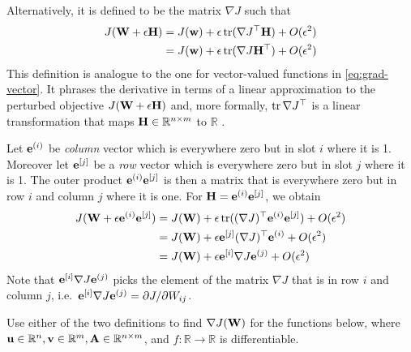 Alternatively, it is defined to be the matrix $\nabla J$ such that
\begin{align}
  J(\mathbf{W}+\epsilon \mathbf{H}) &= J(\mathbf{w}) + \epsilon \operatorname{tr}(\nabla J^\top \mathbf{H}) + O(\epsilon^2) \label{eq:grad-matrix}\\
                    &= J(\mathbf{w}) + \epsilon \operatorname{tr}(\nabla J \mathbf{H}^\top) + O(\epsilon^2)
\end{align}
This definition is analogue to the one for vector-valued functions
in \eqref{eq:grad-vector}. It phrases the derivative in terms of a linear
approximation to the perturbed objective $J(\mathbf{W}+\epsilon \mathbf{H})$ and, more formally,
$\operatorname{tr} \nabla J^\top$ is a linear transformation that maps
$\mathbf{H} \in \mathbb{R}^{n \times m}$ to $\mathbb{R}$ \citep[see e.g.][Chapter 9, for a formal treatment of derivatives]{Rudin1976}.

Let $\mathbf{e}^{(i)}$ be \emph{column} vector which is everywhere zero but in slot $i$
where it is 1. Moreover let $\mathbf{e}^{[j]}$ be a \emph{row} vector which is
everywhere zero but in slot $j$ where it is 1. The outer product
$\mathbf{e}^{(i)}\mathbf{e}^{[j]}$ is then a matrix that is everywhere zero but in row $i$ and
column $j$ where it is one. For $\mathbf{H} = \mathbf{e}^{(i)} \mathbf{e}^{[j]}$, we obtain
\begin{align}
  J(\mathbf{W}+\epsilon \mathbf{e}^{(i)}\mathbf{e}^{[j]}) &= J(\mathbf{W}) + \epsilon \operatorname{tr}((\nabla J)^\top \mathbf{e}^{(i)} \mathbf{e}^{[j]}) + O(\epsilon^2)\\
                                  &= J(\mathbf{W}) + \epsilon  \mathbf{e}^{[j]} (\nabla J)^\top \mathbf{e}^{(i)} + O(\epsilon^2)\\
                                  &= J(\mathbf{W}) + \epsilon \mathbf{e}^{[i]} \nabla J  \mathbf{e}^{(j)}+O(\epsilon^2)
\end{align}
Note that $\mathbf{e}^{[i]} \nabla J \mathbf{e}^{(j)}$ picks the element of the
matrix $\nabla J$ that is in row $i$ and column $j$, i.e.\ $\mathbf{e}^{[i]} \nabla J
\mathbf{e}^{(j)}=\partial J/\partial W_{ij}$.

Use either of the two definitions to find $\nabla
J(\mathbf{W})$ for the functions below, where
$\mathbf{u} \in \mathbb{R}^n, \mathbf{v} \in \mathbb{R}^m, \mathbf{A} \in \mathbb{R}^{n \times m}$, and
$f: \mathbb{R} \rightarrow \mathbb{R}$ is differentiable.

